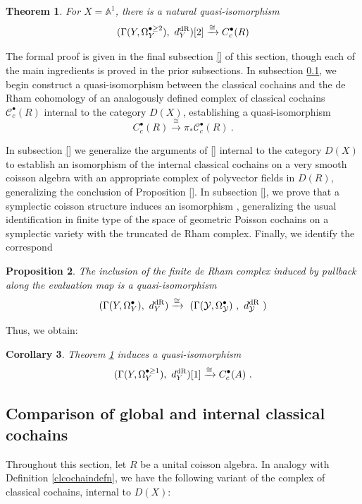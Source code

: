 \documentclass[11pt]{amsart}
\numberwithin{equation}{section}
\newtheorem{theo}{Theorem}[section]
\newtheorem{prop}[theo]{Proposition}
\newtheorem{coro}[theo]{Corollary}
\theoremstyle{definition}
\newcommand{\bb}{\mathbb}
\newcommand{\mc}{\mathcal}
\newcommand{\dR}{{\textup{dR}}}
\newcommand{\0}{{\textbf{0}}}
\newcommand{\DD}{{D}}
\begin{document}
\begin{theo}\label{mainchtheo} For $X=\bb A^1$, there is a natural quasi-isomorphism
	\[  (\Gamma(Y,\Omega^{\bullet \geq 2}_Y), \ d^\dR_{ Y})[2]  \xrightarrow{\cong }C_c^{\bullet}(R)  \]
\end{theo}

The formal proof is given in the final subsection \ref{} of this section, though each of the main ingredients is proved in the prior subsections. In subsection \ref{intclsec}, we begin construct a quasi-isomorphism between the classical cochains and the de Rham cohomology of an analogously defined complex of classical cochains $\mc C_c^{\bullet}(R)$ internal to the category $\DD(X)$, establishing a quasi-isomorphism
\[ C_c^{\bullet}(R) \xrightarrow{\cong} \pi_* \mc C_c^{\bullet}(R) \ .\]

In subsection \ref{} we generalize the arguments of \ref{} internal to the category $\DD(X)$ to establish an isomorphism of the internal classical cochains on a very smooth coisson algebra with an appropriate complex of polyvector fields in $\DD(R)$, generalizing the conclusion of Proposition \ref{}. In subsection \ref{}, we prove that a symplectic coisson structure induces an isomorphism $ $, generalizing the usual identification in finite type of the space of geometric Poisson cochains on a symplectic variety with the truncated de Rham complex. Finally, we identify the correspond



\begin{prop} The inclusion of the finite de Rham complex induced by pullback along the evaluation map is a quasi-isomorphism
	\[  (\Gamma(Y,\Omega^{\bullet}_Y), \ d^\dR_{ Y}) \xrightarrow{\cong} \ (  \Gamma(\mc Y, \Omega^\bullet_{\mc Y}) \ , \ d^\dR_{\mc Y} \ ) \]
\end{prop}

Thus, we obtain:
\begin{coro} Theorem \ref{mainchtheo} induces a quasi-isomorphism
	\[  (\Gamma(Y,\Omega^{\bullet \geq 1}_Y ), \ d^\dR_{ Y})[1] \xrightarrow{\cong}C_c^{\bullet}(A)  \ .  \]
\end{coro}
\subsection{Comparison of global and internal classical cochains}\label{intclsec} Throughout this section, let $R$ be a unital coisson algebra.
In analogy with Definition \ref{clcochaindefn}, we have the following variant of the complex of classical cochains, internal to $\DD(X)$:
\end{document}
